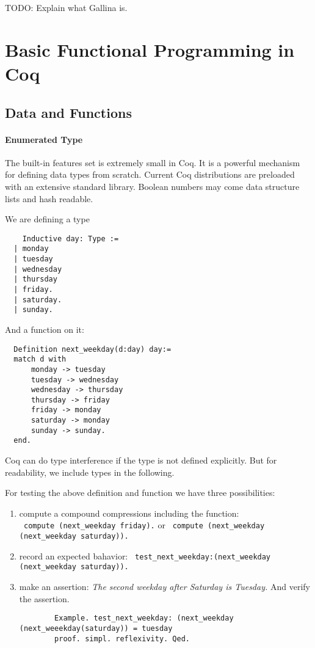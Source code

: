 

TODO: Explain what Gallina is.


\section{Basic Functional Programming in Coq}

\subsection{Data and Functions}
 \paragraph{Enumerated Type}
  The built-in features set is extremely small in Coq. It is a powerful mechanism for defining data types from scratch.
  Current Coq distributions are preloaded with an extensive standard library.
  Boolean numbers may come data structure lists and hash readable. 
  
  \begin{example}
  We are defining a type 
  \begin{lstlisting}
    Inductive day: Type :=
  | monday
  | tuesday
  | wednesday
  | thursday
  | friday.
  | saturday.
  | sunday.
  \end{lstlisting} 
  And a function on it: 
  \begin{lstlisting}
  Definition next_weekday(d:day) day:=
  match d with 
	  monday -> tuesday
	  tuesday -> wednesday
	  wednesday -> thursday
	  thursday -> friday
	  friday -> monday
	  saturday -> monday
	  sunday -> sunday.
  end.  
  \end{lstlisting}
  \end{example}

  Coq can do type interference if the type is not defined explicitly.
  But for readability, we include types in the following.
   
  For testing the above definition and function we have three possibilities:   
   \begin{enumerate}
   \item compute a compound compressions including the function:\\
   \lstinline! compute (next_weekday friday).! or 
   \lstinline! compute (next_weekday (next_weekday saturday)).!
   \item record an expected bahavior: \lstinline! test_next_weekday:(next_weekday (next_weekday saturday)).! 
   \item make an assertion: {\itshape The second weekday after Saturday is Tuesday.} And verify the assertion. 
   \begin{lstlisting}
   		Example. test_next_weekday: (next_weekday (next_weeekday(saturday)) = tuesday 
   		proof. simpl. reflexivity. Qed.
   \end{lstlisting}
   \end{enumerate}   

